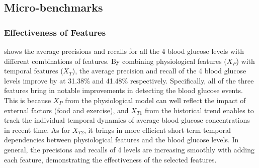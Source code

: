 
\subsection{Micro-benchmarks}
\subsubsection{Effectiveness of Features}
 shows the average precisions and recalls for all the 4 blood glucose levels with different combinations of features.
By combining physiological features ($X_{P}$) with temporal features ($X_{T}$), the average precision and recall of the 4 blood glucose levels improve by at 31.38\% and 41.48\% respectively.
Specifically, all of the three features bring in notable improvements in detecting the blood glucose events.
This is because $X_{P}$ from the physiological model can well reflect the impact of external factors (\eg food and exercise), and $X_{T1}$ from the historical trend enables to track the individual temporal dynamics of average blood glucose concentrations in recent time. As for $X_{T2}$, it brings in  more efficient short-term temporal dependencies between physiological features and the blood glucose levels.
In general, the precisions and recalls of 4 levels are increasing smoothly with adding each feature, demonstrating the effectiveness of the selected features.
